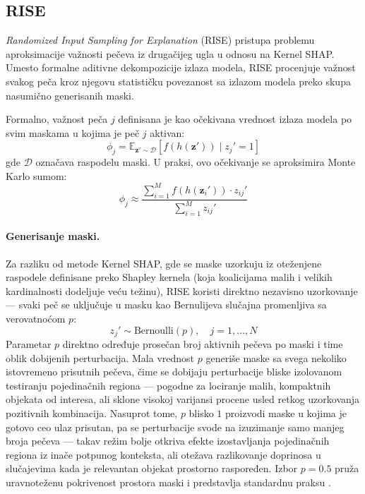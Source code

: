 \subsection{RISE}

\textit{Randomized Input Sampling for Explanation} (RISE) \cite{petsiuk2018rise} 
pristupa problemu aproksimacije važnosti pečeva iz drugačijeg ugla u odnosu na 
Kernel SHAP. Umesto formalne aditivne dekompozicije izlaza modela, RISE procenjuje 
važnost svakog peča kroz njegovu statističku povezanost sa izlazom modela preko 
skupa nasumično generisanih maski.

Formalno, važnost peča $j$ definisana je kao očekivana vrednost izlaza 
modela po svim maskama u kojima je peč $j$ aktivan:
\begin{equation}
    \phi_j = \mathbb{E}_{\mathbf{z}' \sim \mathcal{D}} 
    \left[ f(h(\mathbf{z}')) \mid z_j' = 1 \right]
\end{equation}
gde $\mathcal{D}$ označava raspodelu maski. U praksi, ovo očekivanje se 
aproksimira Monte Karlo sumom:
\begin{equation}
    \phi_j \approx \frac{\sum_{i=1}^{M} f(h(\mathbf{z}_i')) \cdot z_{ij}'}
    {\sum_{i=1}^{M} z_{ij}'}
    \label{eq:rise}
\end{equation}

\paragraph{Generisanje maski.} Za razliku od metode Kernel SHAP, gde se maske uzorkuju iz oteženjene raspodele 
definisane preko Shapley kernela (koja koalicijama malih i velikih kardinalnosti 
dodeljuje veću težinu), RISE koristi direktno nezavisno 
uzorkovanje — svaki peč se uključuje u masku kao Bernulijeva slučajna promenljiva 
sa verovatnoćom $p$:
\begin{equation}
    z_j' \sim \text{Bernoulli}(p), \quad j = 1, \ldots, N
\end{equation}
Parametar $p$ direktno određuje prosečan broj aktivnih pečeva po maski i time 
oblik dobijenih perturbacija. Mala vrednost $p$ generiše maske sa svega 
nekoliko istovremeno prisutnih pečeva, čime se dobijaju perturbacije bliske 
izolovanom testiranju pojedinačnih regiona — pogodne za lociranje malih, 
kompaktnih objekata od interesa, ali sklone visokoj varijansi procene usled 
retkog uzorkovanja pozitivnih kombinacija. Nasuprot tome, $p$ blisko $1$ 
proizvodi maske u kojima je gotovo ceo ulaz prisutan, pa se perturbacije svode 
na izuzimanje samo manjeg broja pečeva — takav režim bolje otkriva efekte 
izostavljanja pojedinačnih regiona iz inače potpunog konteksta, ali otežava 
razlikovanje doprinosa u slučajevima kada je relevantan objekat prostorno 
raspoređen. Izbor $p = 0.5$ pruža uravnoteženu pokrivenost prostora maski i 
predstavlja standardnu praksu \cite{petsiuk2018rise}.


